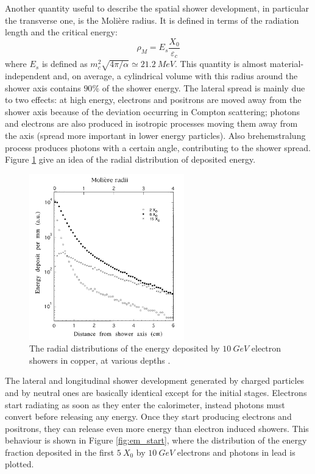 Another quantity useful to describe the spatial shower development, in particular the transverse one, is the Molière radius. It is defined in terms of the radiation length and the critical energy:
\begin{equation}
    \rho_M = E_s \frac{X_0}{\varepsilon_c}
\end{equation}
where $E_s$ is defined as $m_c^2\sqrt{4\pi/\alpha} \simeq 21.2\ MeV$. This quantity is almost material-independent and, on average, a cylindrical volume with this radius around the shower axis contains $90\%$ of the shower energy. The lateral spread is mainly due to two effects: at high energy, electrons and positrons are moved away from the shower axis because of the deviation occurring in Compton scattering; photons and electrons are also produced in isotropic processes moving them away from the axis (spread more important in lower energy particles). Also brehemstralung process produces photons with a certain angle, contributing to the shower spread. Figure \ref{fig:shower_moliere} give an idea of the radial distribution of deposited energy.\\

\begin{figure}
	\centering
	\includegraphics[width=0.6\textwidth]{IMG/Cap2/shower_moliere.png}
	\caption{The radial distributions of the energy deposited by $10\ GeV$ electron showers in copper, at various depths \cite{Leo}.}
	\label{fig:shower_moliere}
\end{figure}

The lateral and longitudinal shower development generated by charged particles and by neutral ones are basically identical except for the initial stages. Electrons start radiating as soon as they enter the calorimeter, instead photons must convert before releasing any energy. Once they start producing electrons and positrons, they can release even more energy than electron induced showers. This behaviour is shown in Figure  \ref{fig:em_start}, where the distribution of the energy fraction deposited in the first $5\ X_0$ by $10\ GeV$ electrons and photons in lead is plotted.

